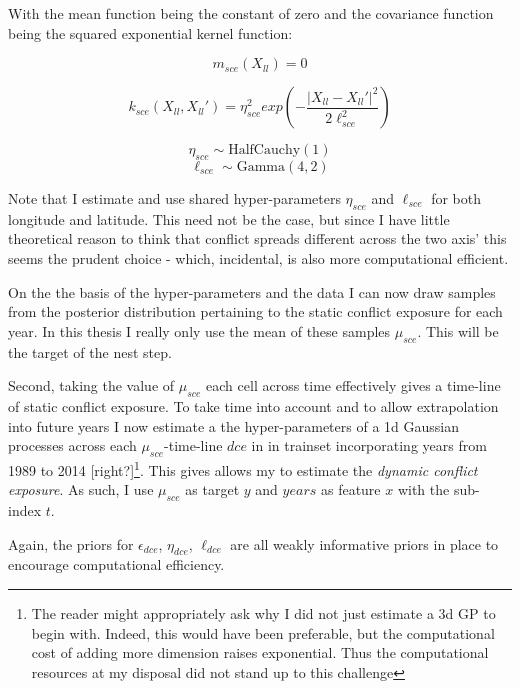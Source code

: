 \documentclass[a4paper]{article}
\begin{document}
With the mean function being the constant of zero and the covariance function being the squared exponential kernel function:

\[
m_{sce}(X_{ll}) = 0
\]

\[
k_{sce}(X_{ll},X_{ll}') = \eta_{sce}^2 exp\left(-\frac{|X_{ll}-X_{ll}'|^2}{2\ell_{sce}^2}\right) %
\]

\[
\eta_{sce} \sim \text{HalfCauchy}(1)
\]
\[
\ell_{sce} \sim \text{Gamma}(4,2)
\]


Note that I estimate and use shared hyper-parameters $\eta_{sce}$ and $\ell_{sce}$ for both longitude and latitude. This need not be the case, but since I have little theoretical reason to think that conflict spreads different across the two axis' this seems the prudent choice - which, incidental, is also more computational efficient.\par

On the the basis of the hyper-parameters and the data I can now draw samples from the posterior distribution pertaining to the static conflict exposure for each year. In this thesis I really only use the mean of these samples $\mu_{sce}$. This will be the target of the nest step.\par


Second, taking the value of $\mu_{sce}$ each cell across time effectively gives a time-line of static conflict exposure. To take time into account and to allow extrapolation into future years I now estimate a the hyper-parameters of a 1d Gaussian processes across each $\mu_{sce}$-time-line $dce$ in in trainset incorporating years from 1989 to 2014 [right?]\footnote{The reader might appropriately ask why I did not just estimate a 3d GP to begin with. Indeed, this would have been preferable, but the computational cost of adding more dimension raises exponential. Thus the computational resources at my disposal did not stand up to this challenge}. This gives allows my to estimate the \emph{dynamic conflict exposure}. As such, I use $\mu_{sce}$ as target $y$ and $years$ as feature $x$ with the sub-index $t$.\par

Again, the priors for $\epsilon_{dce}$, $\eta_{dce}$, $\ell_{dce}$ are all weakly informative priors in place to encourage computational efficiency.\par
\end{document}
